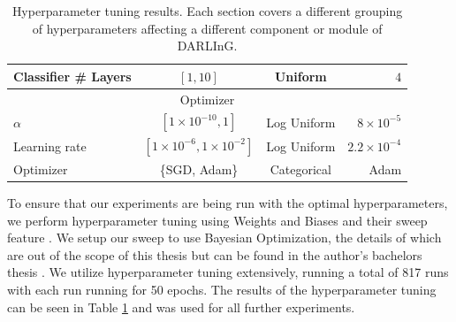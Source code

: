 \begin{table}
{\begin{tabular}{@{}lccr@{}}
		Classifier \# Layers         & $[1, 10]$                                & Uniform            & $4$                  \\ \midrule
		\multicolumn{4}{c}{Optimizer}                                                                                       \\ \midrule
		$\alpha$                       & $[1 \times 10^{-10}, 1]$               & Log Uniform        & $8 \times 10^{-5}$   \\
		Learning rate                  & $[1 \times 10^{-6}, 1 \times 10^{-2}]$ & Log Uniform        & $2.2 \times 10^{-4}$ \\
		Optimizer                      & \{SGD, Adam\}                          & Categorical        & Adam                 \\ \bottomrule
	\end{tabular}
	}
	\caption{Hyperparameter tuning results. Each section covers a different grouping of hyperparameters affecting a different component or module of DARLInG.}
	\label{tab:hpoptim-results}
\end{table}

To ensure that our experiments are being run with the optimal hyperparameters, we perform hyperparameter tuning using Weights and Biases and their sweep feature \cite{wandb}.
We setup our sweep to use Bayesian Optimization, the details of which are out of the scope of this thesis but can be found in the author's bachelors thesis \cite{satyawan2019semantic}.
We utilize hyperparameter tuning extensively, running a total of 817 runs with each run running for 50 epochs.
The results of the hyperparameter tuning can be seen in Table \ref{tab:hpoptim-results} and was used for all further experiments.

